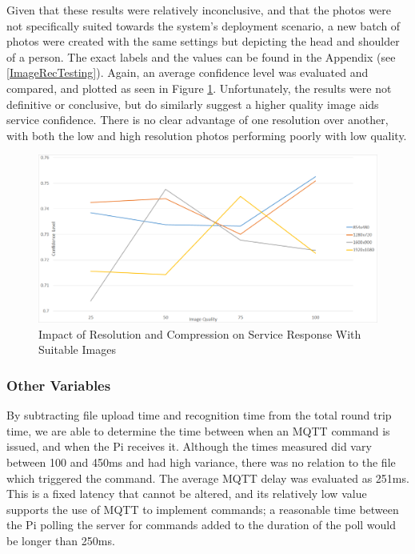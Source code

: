 \documentclass{article}
\begin{document}
Given that these results were relatively inconclusive, and that the photos were not specifically suited towards the system's deployment scenario, a new batch of photos were created with the same settings but depicting the head and shoulder of a person. The exact labels and the values can be found in the Appendix (see \ref{ImageRecTesting}). Again, an average confidence level was evaluated and compared, and plotted as seen in Figure \ref{fig:ImageResImpactOnPerson}. Unfortunately, the results were not definitive or conclusive, but do similarly suggest a higher quality image aids service confidence. There is no clear advantage of one resolution over another, with both the low and high resolution photos performing poorly with low quality.

\begin{figure}[h]
\caption{Impact of Resolution and Compression on Service Response With Suitable Images\label{fig:ImageResImpactOnPerson}}
\includegraphics[width=\textwidth]{ImageResImpactOnPerson}
\end{figure}

\subsubsection{Other Variables}
By subtracting file upload time and recognition time from the total round trip time, we are able to determine the time between when an MQTT command is issued, and when the Pi receives it. Although the times measured did vary between 100 and 450ms and had high variance, there was no relation to the file which triggered the command. The average MQTT delay was evaluated as 251ms. This is a fixed latency that cannot be altered, and its relatively low value supports the use of MQTT to implement commands; a reasonable time between the Pi polling the server for commands added to the duration of the poll would be longer than 250ms. 
\end{document}
